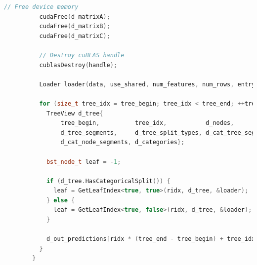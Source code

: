 \documentclass[14pt, a4paper]{extreport}
\begin{document}
\begin{lstlisting}[language=C++, label={lst:xgboost_tensor_kernel_calculation}]
          // Free device memory
          cudaFree(d_matrixA);
          cudaFree(d_matrixB);
          cudaFree(d_matrixC);

          // Destroy cuBLAS handle
          cublasDestroy(handle);

          Loader loader(data, use_shared, num_features, num_rows, entry_start, missing);

          for (size_t tree_idx = tree_begin; tree_idx < tree_end; ++tree_idx) {
            TreeView d_tree{
                tree_begin,          tree_idx,           d_nodes,
                d_tree_segments,     d_tree_split_types, d_cat_tree_segments,
                d_cat_node_segments, d_categories};

            bst_node_t leaf = -1;

            if (d_tree.HasCategoricalSplit()) {
              leaf = GetLeafIndex<true, true>(ridx, d_tree, &loader);
            } else {
              leaf = GetLeafIndex<true, false>(ridx, d_tree, &loader);
            }

            d_out_predictions[ridx * (tree_end - tree_begin) + tree_idx] = __float2half_rn(leaf);
          }
        }

    \end{lstlisting}
    
\end{document}
